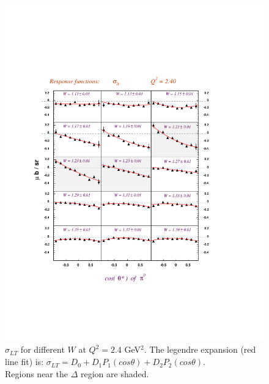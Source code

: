 \begin{figure}[h]
 \includegraphics[width = 15cm, bb=0 100 500 640]{analysis/img/Sigma_lt_Q2_2.40}
  \caption[$\sigma_{LT}$ for different $W$ at $Q^2 = 2.4$ GeV$^2$]
          { $\sigma_{LT}$ for different $W$ at $Q^2 = 2.4$ GeV$^2$. 
		     The legendre expansion (red line fit) is: 
		     $\sigma_{LT} = D_0 + D_1P_1(cos\theta) + D_2P_2(cos\theta) $.\\
	             Regions near the $\Delta $ region are shaded.}
 \label{fig:Sigma_lt_Q2_2.40}
\end{figure}

